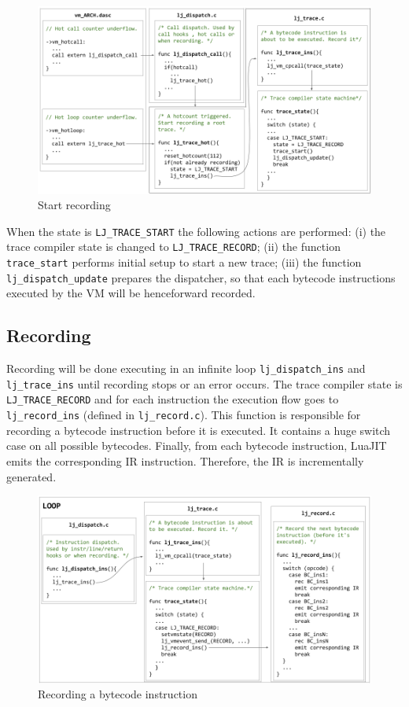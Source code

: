\begin{figure}[H]
    \centering
	\includegraphics[width=\textwidth]{images/chapter7/start_recording.png}
    \caption{Start recording}
    \label{fig:start-recording}
\end{figure}

\noindent
When the state is \texttt{LJ\_TRACE\_START} the following actions are performed: (i) the trace compiler state is changed to \texttt{LJ\_TRACE\_RECORD}; (ii) the function \texttt{trace\_start} performs initial setup to start a new trace; (iii) the function \texttt{lj\_dispatch\_update} prepares the dispatcher, so that each bytecode instructions executed by the VM will be henceforward recorded.

\subsection{Recording}
Recording will be done executing in an infinite loop \texttt{lj\_dispatch\_ins} and \texttt{lj\_trace\_ins} until recording stops or an error occurs. The trace compiler state is \texttt{LJ\_TRACE\_RECORD} and for each instruction the execution flow goes to \texttt{lj\_record\_ins} (defined in \texttt{lj\_record.c}). This function is responsible for recording a bytecode instruction before it is executed. It contains a huge switch case on all possible bytecodes. Finally, from each bytecode instruction, LuaJIT emits the corresponding IR instruction. Therefore, the IR is incrementally generated.

\begin{figure}[H]
    \centering
	\includegraphics[width=\textwidth]{images/chapter7/Record_loop.png}
    \caption{Recording a bytecode instruction}
    \label{fig:recording-bytecode}
\end{figure}

